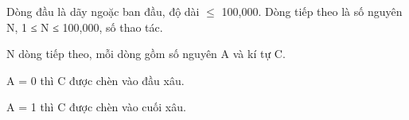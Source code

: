 Dòng đầu là dãy ngoặc ban đầu, độ dài  $\le$  100,000. Dòng tiếp theo là số nguyên N, 1 ≤ N ≤ 100,000, số thao tác.





N dòng tiếp theo, mỗi dòng gồm số nguyên A và kí tự C.


A = 0 thì C được chèn vào đầu xâu.


A = 1 thì C được chèn vào cuối xâu.